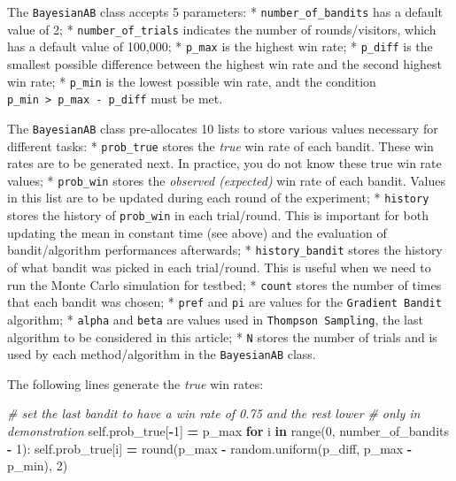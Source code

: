 \documentclass[
]{book}
\newenvironment{Shaded}{\begin{snugshade}}{\end{snugshade}}
\newcommand{\BuiltInTok}[1]{#1}
\newcommand{\CommentTok}[1]{\textcolor[rgb]{0.56,0.35,0.01}{\textit{#1}}}
\newcommand{\ControlFlowTok}[1]{\textcolor[rgb]{0.13,0.29,0.53}{\textbf{#1}}}
\newcommand{\DecValTok}[1]{\textcolor[rgb]{0.00,0.00,0.81}{#1}}
\newcommand{\KeywordTok}[1]{\textcolor[rgb]{0.13,0.29,0.53}{\textbf{#1}}}
\newcommand{\NormalTok}[1]{#1}
\newcommand{\OperatorTok}[1]{\textcolor[rgb]{0.81,0.36,0.00}{\textbf{#1}}}
\newcommand{\VariableTok}[1]{\textcolor[rgb]{0.00,0.00,0.00}{#1}}
\theoremstyle{definition}
\theoremstyle{definition}
\theoremstyle{definition}
\theoremstyle{definition}
\theoremstyle{remark}
\begin{document}
The \texttt{BayesianAB} class accepts 5 parameters:
* \texttt{number\_of\_bandits} has a default value of 2;
* \texttt{number\_of\_trials} indicates the number of rounds/visitors, which has a default value of 100,000;
* \texttt{p\_max} is the highest win rate;
* \texttt{p\_diff} is the smallest possible difference between the highest win rate and the second highest win rate;
* \texttt{p\_min} is the lowest possible win rate, andt the condition \texttt{p\_min\ \textgreater{}\ p\_max\ -\ p\_diff} must be met.

The \texttt{BayesianAB} class pre-allocates 10 lists to store various values necessary for different tasks:
* \texttt{prob\_true} stores the \emph{true} win rate of each bandit. These win rates are to be generated next. In practice, you do not know these true win rate values;
* \texttt{prob\_win} stores the \emph{observed (expected)} win rate of each bandit. Values in this list are to be updated during each round of the experiment;
* \texttt{history} stores the history of \texttt{prob\_win} in each trial/round. This is important for both updating the mean in constant time (see above) and the evaluation of bandit/algorithm performances afterwards;
* \texttt{history\_bandit} stores the history of what bandit was picked in each trial/round. This is useful when we need to run the Monte Carlo simulation for testbed;
* \texttt{count} stores the number of times that each bandit was chosen;
* \texttt{pref} and \texttt{pi} are values for the \texttt{Gradient\ Bandit} algorithm;
* \texttt{alpha} and \texttt{beta} are values used in \texttt{Thompson\ Sampling}, the last algorithm to be considered in this article;
* \texttt{N} stores the number of trials and is used by each method/algorithm in the \texttt{BayesianAB} class.

The following lines generate the \emph{true} win rates:

\begin{Shaded}
\begin{Highlighting}[]
        \CommentTok{\# set the last bandit to have a win rate of 0.75 and the rest lower}
        \CommentTok{\# only in demonstration}
        \VariableTok{self}\NormalTok{.prob\_true[}\OperatorTok{{-}}\DecValTok{1}\NormalTok{] }\OperatorTok{=}\NormalTok{ p\_max}
        \ControlFlowTok{for}\NormalTok{ i }\KeywordTok{in} \BuiltInTok{range}\NormalTok{(}\DecValTok{0}\NormalTok{, number\_of\_bandits }\OperatorTok{{-}} \DecValTok{1}\NormalTok{):}
            \VariableTok{self}\NormalTok{.prob\_true[i] }\OperatorTok{=} \BuiltInTok{round}\NormalTok{(p\_max }\OperatorTok{{-}}\NormalTok{ random.uniform(p\_diff, p\_max }\OperatorTok{{-}}\NormalTok{ p\_min), }\DecValTok{2}\NormalTok{)}
\end{Highlighting}
\end{Shaded}
\end{document}
